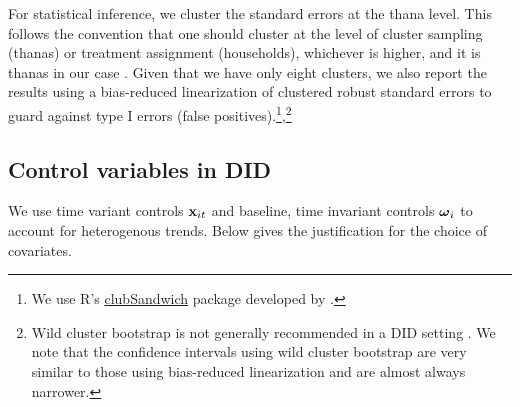 \documentclass[12pt,letterpaper]{article}\usepackage[margin=1in]{geometry}
\newcommand{\bfomega}{\ensuremath{\mbox{\boldmath $\omega$}}}
\newcommand{\bfx}{\ensuremath{\mbox{\bf x}}}
\newcommand{\0}{\ensuremath{\mbox{\boldmath $0$}}}
\begin{document}
For statistical inference, we cluster the standard errors at the thana level. This follows the convention that one should cluster at the level of cluster sampling (thanas) or treatment assignment (households), whichever is higher, and it is thanas in our case \citep{abadie2023should}. 
Given that we have only eight clusters, we also report the results using a bias-reduced linearization \citep[Satterthwaite correction, see][]{BellMcCaffrey2002, ImbensKolesar2016, PustejovskyTipton2018} of clustered robust standard errors to guard against type I errors (false positives).\footnote{We use R's \href{https://cran.r-project.org/web/packages/clubSandwich/vignettes/panel-data-CRVE.html}{\textsf{clubSandwich}} package developed by \citet{PustejovskyTipton2018}.},\footnote{Wild cluster bootstrap is not generally recommended in a DID setting \citep{CanaySantosShaikh2021}. We note that the confidence intervals using wild cluster bootstrap are very similar to those using bias-reduced linearization and are almost always narrower.\label{fnWCB}} 


\subsection{Control variables in DID}

We use time variant controls $\bfx_{it}$ and baseline, time invariant controls $\bfomega_{i}$ to account for heterogenous trends. Below gives the justification for the choice of covariates. 
\end{document}
